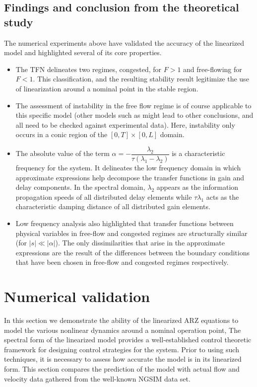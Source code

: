 \documentclass[preprint]{elsarticle}
\begin{document}
\subsection{Findings and conclusion from the theoretical study}
The numerical experiments above have validated the accuracy of the linearized model and highlighted several of its core properties.
\begin{itemize}
\item The TFN delineates two regimes, congested, for $F > 1$ and free-flowing for $F < 1$. This classification, and the resulting stability result legitimize the use of linearization around a nominal point in the stable region.
\item  The assessment of instability in the free flow regime is of course applicable to this specific model (other models such as \cite{Jamitons-multi-valued-fund} might lead to other conclusions, and all need to be checked against experimental data). Here, instability only occurs in a conic region of the  $\left[0,T\right] \times \left[0,L\right]$ domain.
\item The absolute value of the term $\alpha = -\dfrac{\lambda_2}{\tau(\lambda_1 - \lambda_2)}$ is a characteristic frequency for the system. It delineates the low frequency domain in which approximate expressions help decompose the transfer functions in gain and delay components. In the spectral domain, $\lambda_{2}$ appears as the information propagation speeds of all distributed delay elements while  $\tau\lambda_{1}$ acts as the characteristic damping distance of all distributed gain elements.
\item Low frequency analysis also highlighted that transfer functions between physical variables in free-flow and congested regimes are structurally similar (for $\left|s\right|\ll\left|\alpha\right|$). The only dissimilarities that arise in the approximate expressions are the result of the differences between the boundary conditions that have been chosen in free-flow and congested regimes respectively.
\end{itemize}


\section{Numerical validation}

In this section we demonstrate the ability of the linearized ARZ equations to model the various nonlinear dynamics around a nominal operation point, The spectral form of the linearized
model provides a well-established control theoretic framework for designing control strategies for the system. Prior to using such techniques, it is necessary to assess how accurate the
model is in its linearized form. This section compares the prediction of the model with actual flow
and velocity data gathered from the well-known NGSIM data set.
\end{document}
